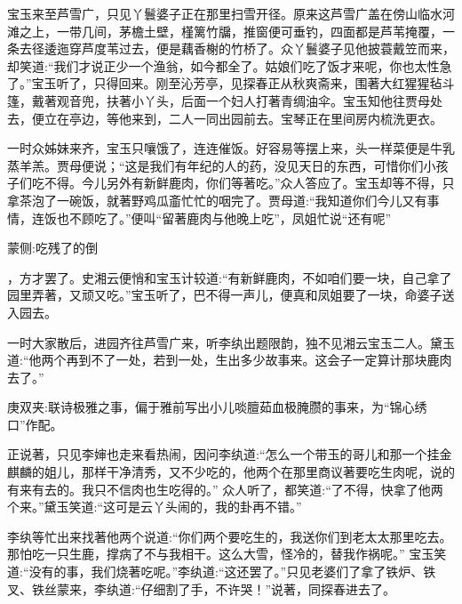 \begin{parag}
    宝玉来至芦雪广，只见丫鬟婆子正在那里扫雪开径。原来这芦雪广盖在傍山临水河滩之上，一带几间，茅檐土壁，槿篱竹牖，推窗便可垂钓，四面都是芦苇掩覆，一条去径逶迤穿芦度苇过去，便是藕香榭的竹桥了。众丫鬟婆子见他披蓑戴笠而来，却笑道:“我们才说正少一个渔翁，如今都全了。姑娘们吃了饭才来呢，你也太性急了。”宝玉听了，只得回来。刚至沁芳亭，见探春正从秋爽斋来，围著大红猩猩毡斗篷，戴著观音兜，扶著小丫头，后面一个妇人打著青绸油伞。宝玉知他往贾母处去，便立在亭边，等他来到，二人一同出园前去。宝琴正在里间房内梳洗更衣。
\end{parag}


\begin{parag}
    一时众姊妹来齐，宝玉只嚷饿了，连连催饭。好容易等摆上来，头一样菜便是牛乳蒸羊羔。贾母便说；“这是我们有年纪的人的药，没见天日的东西，可惜你们小孩子们吃不得。今儿另外有新鲜鹿肉，你们等著吃。”众人答应了。宝玉却等不得，只拿茶泡了一碗饭，就著野鸡瓜齑忙忙的咽完了。贾母道:“我知道你们今儿又有事情，连饭也不顾吃了。”便叫“留著鹿肉与他晚上吃”，凤姐忙说“还有呢”\begin{note}蒙侧:吃残了的倒\end{note}，方才罢了。史湘云便悄和宝玉计较道:“有新鲜鹿肉，不如咱们要一块，自己拿了园里弄著，又顽又吃。”宝玉听了，巴不得一声儿，便真和凤姐要了一块，命婆子送入园去。
\end{parag}


\begin{parag}
    一时大家散后，进园齐往芦雪广来，听李纨出题限韵，独不见湘云宝玉二人。黛玉道:“他两个再到不了一处，若到一处，生出多少故事来。这会子一定算计那块鹿肉去了。”\begin{note}庚双夹:联诗极雅之事，偏于雅前写出小儿啖膻茹血极腌臜的事来，为“锦心绣口”作配。\end{note}正说著，只见李婶也走来看热闹，因问李纨道:“怎么一个带玉的哥儿和那一个挂金麒麟的姐儿，那样干净清秀，又不少吃的，他两个在那里商议著要吃生肉呢，说的有来有去的。我只不信肉也生吃得的。” 众人听了，都笑道:“了不得，快拿了他两个来。”黛玉笑道:“这可是云丫头闹的，我的卦再不错。”
\end{parag}


\begin{parag}
    李纨等忙出来找著他两个说道:“你们两个要吃生的，我送你们到老太太那里吃去。那怕吃一只生鹿，撑病了不与我相干。这么大雪，怪冷的，替我作祸呢。” 宝玉笑道:“没有的事，我们烧著吃呢。”李纨道:“这还罢了。”只见老婆们了拿了铁炉、铁叉、铁丝蒙来，李纨道:“仔细割了手，不许哭！”说著，同探春进去了。
\end{parag}


